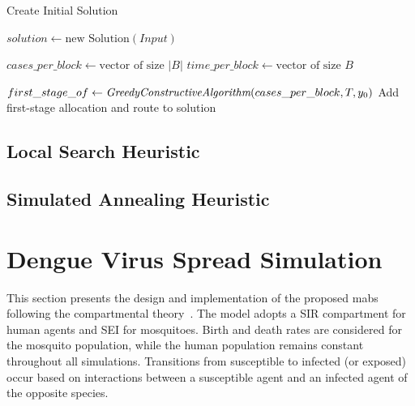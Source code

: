 \begin{algorithm}[h!]
	\caption{Create Initial Solution}
	\SetAlgoLined

	$solution \leftarrow \text{new Solution}(Input)$\;

	$cases\_per\_block \leftarrow \text{vector of size } |B|$\;
	$time\_per\_block \leftarrow \text{vector of size } B$\;


	$first\_stage\_of \leftarrow \textit{GreedyConstructiveAlgorithm}(cases\_per\_block, T, y_0)$\;
	Add first-stage allocation and route to solution\;

	\;
\end{algorithm}

\subsection{Local Search Heuristic}

\subsection{Simulated Annealing Heuristic}

\section{Dengue Virus Spread Simulation}\label{sec:dengue-virus-spread-simulation}

This section presents the design and implementation of the proposed \gls{mabs}
following the compartmental theory~\citep{amaku:2014}. The model adopts a SIR
compartment for human agents and SEI for mosquitoes. Birth and death rates are
considered for the mosquito population, while the human population remains
constant throughout all simulations. Transitions from susceptible to infected
(or exposed) occur based on interactions between a susceptible agent and an
infected agent of the opposite species.

